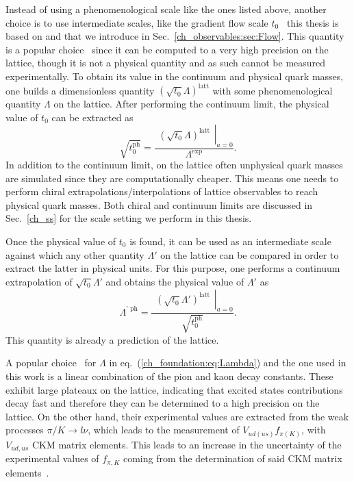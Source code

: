 Instead of using a phenomenological scale like the ones listed above, another choice is to use intermediate scales, like the gradient flow scale $t_0$~\citep{Luscher:2010we,1006.4518} this thesis is based on and that we introduce in Sec.~\ref{ch_observables:sec:Flow}. This quantity is a popular choice~\citep{Bruno:2016plf,Strassberger:2023xnj,RQCD_scale,Kostrzewa:2021syw,Hollwieser:2020qri,MILC:2015tqx} since it can be computed to a very high precision on the lattice, though it is not a physical quantity and as such cannot be measured experimentally. To obtain its value in the continuum and physical quark masses, one builds a dimensionless quantity $(\sqrt{t_0}\Lambda)^{\textrm{latt}}$ with some phenomenological quantity $\Lambda$ on the lattice. After performing the continuum limit, the physical value of $t_0$ can be extracted as
\begin{equation}
\label{ch_foundation:eq:Lambda}
\sqrt{t_0^{\textrm{ph}}}=\frac{\left.\begin{matrix}
\left(\sqrt{t_0}\Lambda\right)^{\textrm{latt}}
\end{matrix}\right|_{a=0}}{\Lambda^{\textrm{exp}}}.
\end{equation}
In addition to the continuum limit, on the lattice often unphysical quark masses are simulated since they are computationally cheaper. This means one needs to perform chiral extrapolations/interpolations of lattice observables to reach physical quark masses. Both chiral and continuum limits are discussed in Sec.~\ref{ch_ss} for the scale setting we perform in this thesis.

Once the physical value of $t_0$ is found, it can be used as an intermediate scale against which any other quantity $\Lambda'$ on the lattice can be compared in order to extract the latter in physical units. For this purpose, one performs a continuum extrapolation of $\sqrt{t_0}\Lambda'$ and obtains the physical value of $\Lambda'$ as
\begin{equation}
\Lambda^{\textrm{' ph}}=\frac{\left.\begin{matrix}
\left(\sqrt{t_0}\Lambda'\right)^{\textrm{latt}}
\end{matrix}\right|_{a=0}}{\sqrt{t_0^{\textrm{ph}}}}.
\end{equation}
This quantity is already a prediction of the lattice.

A popular choice~\citep{Brown:2018jtv,BMW:2012hcm,BMW:2012hcm,Bruno:2016plf,Strassberger:2023xnj} for $\Lambda$ in eq.~(\ref{ch_foundation:eq:Lambda}) and the one used in this work is a linear combination of the pion and kaon decay constants. These exhibit large plateaux on the lattice, indicating that excited states contributions decay fast and therefore they can be determined to a high precision on the lattice. On the other hand, their experimental values are extracted from the weak processes $\pi/K\to l\nu$, which leads to the measurement of $V_{ud(us)}f_{\pi(K)}$, with $V_{ud,us}$ CKM matrix elements. This leads to an increase in the uncertainty of the experimental values of $f_{\pi,K}$ coming from the determination of said CKM matrix elements~\citep{FlavourLatticeAveragingGroupFLAG:2021npn}.

